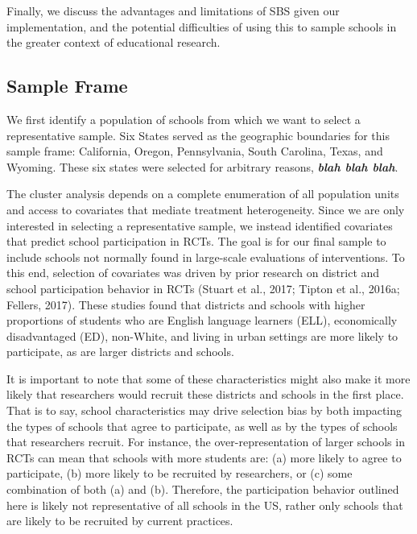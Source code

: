 \documentclass[man,floatsintext]{apa6}
\begin{document}
Finally, we discuss the advantages and limitations of SBS given our implementation, and the potential difficulties of using this to sample schools in the greater context of educational research.

\hypertarget{sample-frame}{%
\subsection{Sample Frame}\label{sample-frame}}

We first identify a population of schools from which we want to select a representative sample. Six States served as the geographic boundaries for this sample frame: California, Oregon, Pennsylvania, South Carolina, Texas, and Wyoming. These six states were selected for arbitrary reasons, \textbf{\emph{blah blah blah}}.

The cluster analysis depends on a complete enumeration of all population units and access to covariates that mediate treatment heterogeneity. Since we are only interested in selecting a representative sample, we instead identified covariates that predict school participation in RCTs. The goal is for our final sample to include schools not normally found in large-scale evaluations of interventions. To this end, selection of covariates was driven by prior research on district and school participation behavior in RCTs (Stuart et al., 2017; Tipton et al., 2016a; Fellers, 2017). These studies found that districts and schools with higher proportions of students who are English language learners (ELL), economically disadvantaged (ED), non-White, and living in urban settings are more likely to participate, as are larger districts and schools.

It is important to note that some of these characteristics might also make it more likely that researchers would recruit these districts and schools in the first place. That is to say, school characteristics may drive selection bias by both impacting the types of schools that agree to participate, as well as by the types of schools that researchers recruit. For instance, the over-representation of larger schools in RCTs can mean that schools with more students are: (a) more likely to agree to participate, (b) more likely to be recruited by researchers, or (c) some combination of both (a) and (b). Therefore, the participation behavior outlined here is likely not representative of all schools in the US, rather only schools that are likely to be recruited by current practices.
\end{document}
